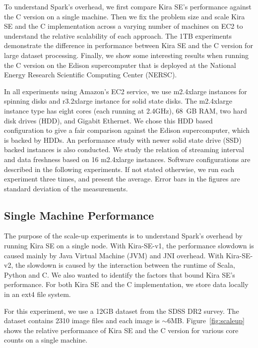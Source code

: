 \documentclass[10pt,journal,compsoc]{IEEEtran}
\begin{document}
To understand Spark's overhead, we first compare Kira SE's performance against the C version on a single
machine. Then we fix the problem size and scale Kira SE and the C implementation across a
varying number of machines on EC2 to understand the relative scalability of each approach.
The 1TB experiments demonstrate the difference in performance between Kira SE and the C version
for large dataset processing. Finally, we show some interesting results when running the C
version on the Edison supercomputer that is deployed at the National Energy Research Scientific Computing Center (NERSC).

In all experiments using Amazon's EC2 service, we use m2.4xlarge instances for spinning disks and r3.2xlarge instance for solid state disks.
The m2.4xlarge instance type has eight cores (each running at 2.4GHz), 68~GB RAM, two hard disk drives (HDD), and Gigabit Ethernet. 
We chose this HDD based configuration to give a fair comparison against the Edison supercomputer, which is backed by HDDs. 
An performance study with newer solid state drive (SSD) backed instances is also conducted.
We study the relation of streaming interval and data freshness based on 16 m2.4xlarge instances.
Software configurations are described in the following experiments.
If not stated otherwise, we run each experiment three times, and present the average.
Error bars in the figures are standard deviation of the measurements.

\subsection{Single Machine Performance}
\label{sec:Performance-scaleup}

The purpose of the scale-up experiments is to understand Spark's overhead by running
Kira SE on a single node. 
With Kira-SE-v1, the performance slowdown is caused mainly by Java Virtual Machine (JVM) and JNI overhead.
With Kira-SE-v2, the slowdown is caused by the interaction between the runtime of Scala, Python and C. 
We also wanted to identify the factors that bound Kira SE's performance. 
For both Kira SE and the C implementation, we store data locally in an ext4 file system.

For this experiment, we use a 12GB dataset from the SDSS DR2 survey. The dataset contains
2310 image files and each image is $\sim$6MB.
Figure~\ref{fig:scaleup} shows the relative
performance of Kira SE and the C version for various core counts on a single machine.
\end{document}

